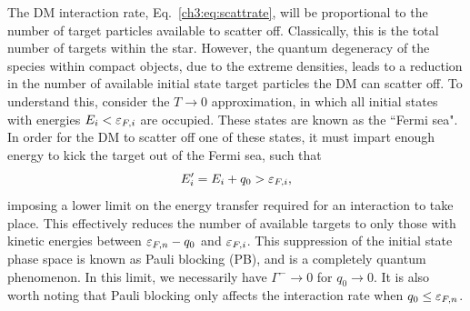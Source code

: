 The DM interaction rate, Eq.~\ref{ch3:eq:scattrate}, will be proportional to the number of target particles available to scatter off. Classically, this is the total number of targets within the star. However, the quantum degeneracy of the species within compact objects, due to the extreme densities, leads to a reduction in the number of available initial state target particles the DM can scatter off.
To understand this, consider the $T\rightarrow 0$ approximation, in which all initial states with energies $E_i < \varepsilon_{F,i}$ are occupied. These states are known as the ``Fermi sea". In order for the DM to scatter off one of these states, it must impart enough energy to kick the target out of the Fermi sea, such that 
\begin{equation}
    E_i' = E_i + q_0 > \varepsilon_{F,i},
\end{equation}
imposing a lower limit on the energy transfer required for an interaction to take place. This effectively reduces the number of available targets to only those with kinetic energies between $\varepsilon_{F,n} - q_0$ and $\varepsilon_{F,i}$. 
This suppression of the initial state phase space is known as Pauli blocking (PB), and is a completely quantum phenomenon.
In this limit, we necessarily have $\Gamma^-\rightarrow 0$ for $q_0\rightarrow 0$. 
It is also worth noting that Pauli blocking only affects the interaction rate when $q_0\le \varepsilon_{F,n}$.


